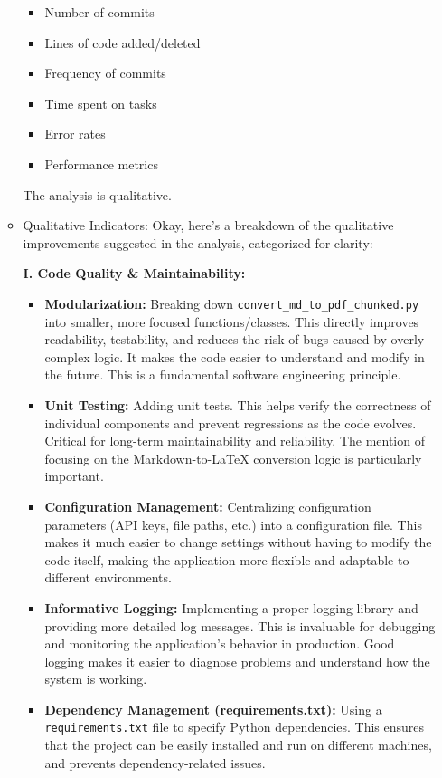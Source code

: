 \documentclass{article}
\begin{document}
\begin{itemize}
\begin{itemize}
        \begin{itemize}
            \item Number of commits
            \item Lines of code added/deleted
            \item Frequency of commits
            \item Time spent on tasks
            \item Error rates
            \item Performance metrics
        \end{itemize}
        The analysis is qualitative.
        \item Qualitative Indicators: Okay, here's a breakdown of the qualitative improvements suggested in the analysis, categorized for clarity:

        \textbf{I. Code Quality \& Maintainability:}
        \begin{itemize}
            \item \textbf{Modularization:} Breaking down \texttt{convert\_md\_to\_pdf\_chunked.py} into smaller, more focused functions/classes.  This directly improves readability, testability, and reduces the risk of bugs caused by overly complex logic.  It makes the code easier to understand and modify in the future.  This is a fundamental software engineering principle.
            \item \textbf{Unit Testing:} Adding unit tests. This helps verify the correctness of individual components and prevent regressions as the code evolves.  Critical for long-term maintainability and reliability. The mention of focusing on the Markdown-to-LaTeX conversion logic is particularly important.
            \item \textbf{Configuration Management:} Centralizing configuration parameters (API keys, file paths, etc.) into a configuration file.  This makes it much easier to change settings without having to modify the code itself, making the application more flexible and adaptable to different environments.
            \item \textbf{Informative Logging:} Implementing a proper logging library and providing more detailed log messages.  This is invaluable for debugging and monitoring the application's behavior in production.  Good logging makes it easier to diagnose problems and understand how the system is working.
           \item \textbf{Dependency Management (requirements.txt):} Using a \texttt{requirements.txt} file to specify Python dependencies. This ensures that the project can be easily installed and run on different machines, and prevents dependency-related issues.
        \end{itemize}


\end{itemize}
\end{itemize}
\end{document}
